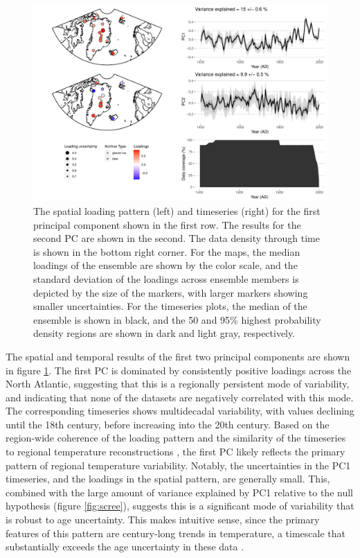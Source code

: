 \documentclass[gchron, manuscript]{copernicus}
\begin{document}
\begin{figure}
\includegraphics[width=12cm]{geoChronR-paper_files/figure-latex/pca-1} \caption{The spatial loading pattern (left) and timeseries (right) for the first principal component shown in the first row. The results for the second PC are shown in the second. The data density through time is shown in the bottom right corner. For the maps, the median loadings of the ensemble are shown by the color scale, and the standard deviation of the loadings across ensemble members is depicted by the size of the markers, with larger markers showing smaller uncertainties. For the timeseries plots, the median of the ensemble is shown in black, and the 50 and 95\% highest probability density regions are shown in dark and light gray, respectively.}\label{fig:pca}
\end{figure}

The spatial and temporal results of the first two principal components are shown in figure \ref{fig:pca}.
The first PC is dominated by consistently positive loadings across the North Atlantic, suggesting that this is a regionally persistent mode of variability, and indicating that none of the datasets are negatively correlated with this mode.
The corresponding timeseries shows multidecadal variability, with values declining until the 18th century, before increasing into the 20th century.
Based on the region-wide coherence of the loading pattern and the similarity of the timeseries to regional temperature reconstructions \citep{paico, McKayKaufman2014, werner2018arcticCFR}, the first PC likely reflects the primary pattern of regional temperature variability.
Notably, the uncertainties in the PC1 timeseries, and the loadings in the spatial pattern, are generally small.
This, combined with the large amount of variance explained by PC1 relative to the null hypothesis (figure \ref{fig:scree}), suggests this is a significant mode of variability that is robust to age uncertainty.
This makes intuitive sense, since the primary features of this pattern are century-long trends in temperature, a timescale that substantially exceeds the age uncertainty in these data \citep{McKayKaufman2014}.
\end{document}
